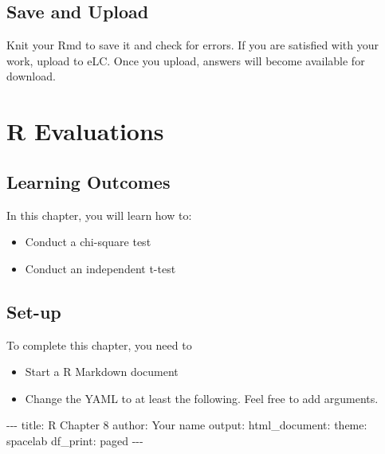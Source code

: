 \documentclass[
]{book}
\makeatletter
\newenvironment{Shaded}{\begin{snugshade}}{\end{snugshade}}
\newcommand{\NormalTok}[1]{#1}
\newcommand{\SpecialCharTok}[1]{\textcolor[rgb]{0,0,0}{#1}}
\newcommand{\StringTok}[1]{\textcolor[rgb]{0.5,0.5,0.5}{#1}}
\providecommand{\tightlist}{%
  \setlength{\itemsep}{0pt}\setlength{\parskip}{0pt}}
\newenvironment{kframe}{%
\medskip{}
\setlength{\fboxsep}{.8em}
 \def\at@end@of@kframe{}%
 \ifinner\ifhmode%
  \def\at@end@of@kframe{\end{minipage}}%
  \begin{minipage}{\columnwidth}%
 \fi\fi%
 \def\FrameCommand##1{\hskip\@totalleftmargin \hskip-\fboxsep
 \colorbox{shadecolor}{##1}\hskip-\fboxsep
     \hskip-\linewidth \hskip-\@totalleftmargin \hskip\columnwidth}%
 \MakeFramed {\advance\hsize-\width
   \@totalleftmargin\z@ \linewidth\hsize
   \@setminipage}}%
 {\par\unskip\endMakeFramed%
 \at@end@of@kframe}
\renewenvironment{Shaded}{\begin{kframe}}{\end{kframe}}
\makeatother
\begin{document}
\hypertarget{save-and-upload}{%
\section{Save and Upload}\label{save-and-upload}}

Knit your Rmd to save it and check for errors. If you are satisfied with your work, upload to eLC. Once you upload, answers will become available for download.

\hypertarget{r-evaluations}{%
\chapter{R Evaluations}\label{r-evaluations}}

\hypertarget{learning-outcomes}{%
\section{Learning Outcomes}\label{learning-outcomes}}

In this chapter, you will learn how to:

\begin{itemize}
\tightlist
\item
  Conduct a chi-square test
\item
  Conduct an independent t-test
\end{itemize}

\hypertarget{set-up}{%
\section{Set-up}\label{set-up}}

To complete this chapter, you need to

\begin{itemize}
\tightlist
\item
  Start a R Markdown document
\item
  Change the YAML to at least the following. Feel free to add arguments.
\end{itemize}

\begin{Shaded}
\begin{Highlighting}[]
\SpecialCharTok{{-}{-}{-}}
\NormalTok{title}\SpecialCharTok{:} \StringTok{\textquotesingle{}R Chapter 8\textquotesingle{}}
\NormalTok{author}\SpecialCharTok{:} \StringTok{\textquotesingle{}Your name\textquotesingle{}}
\NormalTok{output}\SpecialCharTok{:} 
\NormalTok{  html\_document}\SpecialCharTok{:}
\NormalTok{    theme}\SpecialCharTok{:}\NormalTok{ spacelab}
\NormalTok{    df\_print}\SpecialCharTok{:}\NormalTok{ paged}
\SpecialCharTok{{-}{-}{-}}
\end{Highlighting}
\end{Shaded}
\end{document}
